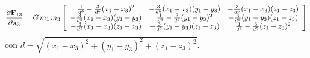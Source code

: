 \begin{equation*}
 \frac{\partial {\bf F}_{13}}{\partial {\bf x}_3} = G \, m_1 \, m_3 
\left[ \begin{array}{ccc}
       {\frac{1}{{d}^{3}} - \frac{3}{{d}^{5}} (x_1 - x_3)^2} & {- \frac{3}{{d}^{5}} (x_1 - x_3) (y_1 - y_3)} & {- \frac{3}{{d}^{5}} (x_1 - x_3) (z_1 - z_3)} \\
       {- \frac{3}{{d}^{5}} (x_1 - x_3) (y_1 - y_3)} & {\frac{1}{{d}^{3}} - \frac{3}{{d}^{5}} (y_1 - y_3)^2} & {- \frac{3}{{d}^{5}} (y_1 - y_3) (z_1 - z_3)} \\
       {- \frac{3}{{d}^{5}} (x_1 - x_3) (z_1 - z_3)} & {- \frac{3}{{d}^{5}} (y_1 - y_3) (z_1 - z_3)} & {\frac{1}{{d}^{3}} - \frac{3}{{d}^{5}} (z_1 - z_3)^2}
       \end{array} \right]
\end{equation*}
con $d = \sqrt{(x_1 - x_3)^2 + (y_1 - y_3)^2 + (z_1 - z_3)^2}$.

% 
